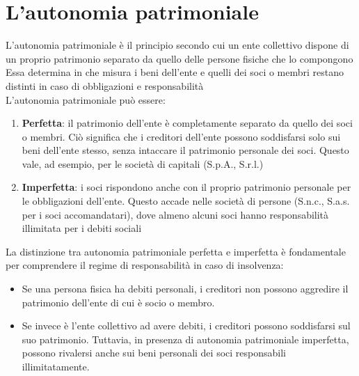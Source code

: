 \documentclass[8pt,oneside,a4paper]{article}
\begin{document}
	\section{L'autonomia patrimoniale}
	L'autonomia patrimoniale è il principio secondo cui un ente collettivo dispone di un proprio patrimonio separato da quello delle persone fisiche che lo compongono\\
	Essa determina in che misura i beni dell'ente e quelli dei soci o membri restano distinti in caso di obbligazioni e responsabilità\\
	L'autonomia patrimoniale può essere:  
	\begin{enumerate}
		\item \textbf{Perfetta}: il patrimonio dell'ente è completamente separato da quello dei soci o membri. Ciò significa che i creditori dell'ente possono soddisfarsi solo sui beni dell'ente stesso, senza intaccare il patrimonio personale dei soci. Questo vale, ad esempio, per le società di capitali (S.p.A., S.r.l.)
		\item \textbf{Imperfetta}: i soci rispondono anche con il proprio patrimonio personale per le obbligazioni dell'ente. Questo accade nelle società di persone (S.n.c., S.a.s. per i soci accomandatari), dove almeno alcuni soci hanno responsabilità illimitata per i debiti sociali
	\end{enumerate}
	La distinzione tra autonomia patrimoniale perfetta e imperfetta è fondamentale per comprendere il regime di responsabilità in caso di insolvenza:  
	\begin{itemize}
		\item Se una persona fisica ha debiti personali, i creditori non possono aggredire il patrimonio dell'ente di cui è socio o membro.  
		\item Se invece è l'ente collettivo ad avere debiti, i creditori possono soddisfarsi sul suo patrimonio. Tuttavia, in presenza di autonomia patrimoniale imperfetta, possono rivalersi anche sui beni personali dei soci responsabili illimitatamente.  
	\end{itemize}
\end{document}
